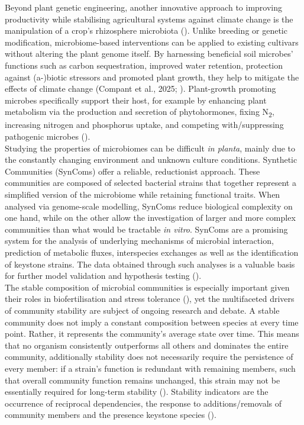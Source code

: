 Beyond plant genetic engineering, another innovative approach to improving productivity while stabilising agricultural systems against climate change is the manipulation of a crop's rhizosphere microbiota (\cite{wang_narrow-spectrum_2025}). Unlike breeding or genetic modification, microbiome-based interventions can be applied to existing cultivars without altering the plant genome itself. By harnessing beneficial soil microbes’ functions such as carbon sequestration, improved water retention, protection against (a-)biotic stressors and promoted plant growth, they help to mitigate the effects of climate change (Compant et al., 2025; \cite{jansson_soil_2020}). Plant-growth promoting microbes specifically support their host, for example by enhancing plant metabolism via the production and secretion of phytohormones, fixing N\textsubscript{2}, increasing nitrogen and phosphorus uptake, and competing with/suppressing pathogenic microbes (\cite{ansabayeva_plant_2025}). 
\\


Studying the properties of microbiomes can be difficult \textit{in planta}, mainly due to the constantly changing environment and unknown culture conditions. Synthetic Communities (SynComs) offer a reliable, reductionist approach. These communities are composed of selected bacterial strains that together represent a simplified version of the microbiome while retaining functional traits. When analysed via genome-scale modelling, SynComs reduce biological complexity on one hand, while on the other allow the investigation of larger and more complex communities than what would be tractable \textit{in vitro}. SynComs are a promising system for the analysis of underlying mechanisms of microbial interaction, prediction of metabolic fluxes, interspecies exchanges as well as the identification of keystone strains. The data obtained through such analyses is a valuable basis for further model validation and hypothesis testing (\cite{feierabend_silico_2025}). 
\\


The stable composition of microbial communities is especially important given their roles in biofertilisation and stress tolerance (\cite{chem_towards_2025, qi_higher_2026}), yet the multifaceted drivers of community stability are subject of ongoing research and debate. A stable community does not imply a constant composition between species at every time point. Rather, it represents the community's average state over time. This means that no organism consistently outperforms all others and dominates the entire community, additionally stability does not necessarily require the persistence of every member: if a strain’s function is redundant with remaining members, such that overall community function remains unchanged, this strain may not be essentially required for long-term stability (\cite{allison_resistance_2008}). Stability indicators are the occurrence of reciprocal dependencies, the response to additions/removals of community members and the presence keystone species (\cite{butler_stability_2018, liu_keystone_2025, wang_narrow-spectrum_2025, zelezniak_metabolic_2015}). 
\\



